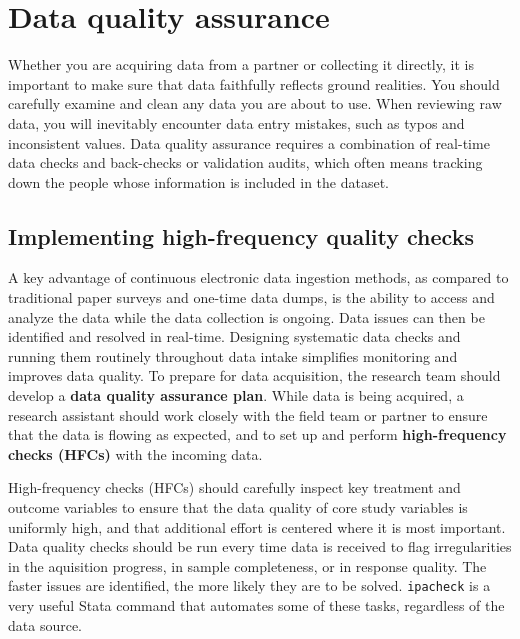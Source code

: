\section{Data quality assurance}

Whether you are acquiring data from a partner or collecting it directly,
it is important to make sure that data faithfully reflects ground realities.
You should carefully examine and clean any data you are about to use.
When reviewing raw data, you will inevitably encounter data entry mistakes,
such as typos and inconsistent values.
Data quality assurance requires a combination of real-time data checks
and back-checks or validation audits, which often means tracking down
the people whose information is included in the dataset.

\subsection{Implementing high-frequency quality checks}

A key advantage of continuous electronic data ingestion methods,
as compared to traditional paper surveys and one-time data dumps,
is the ability to access and analyze the data while the data collection is ongoing.
Data issues can then be identified and resolved in real-time.
Designing systematic data checks and running them routinely throughout data intake
simplifies monitoring and improves data quality.
To prepare for data acquisition,
the research team should develop a \textbf{data quality assurance plan}.
While data is being acquired,
a research assistant should work closely with the field team or partner
to ensure that the data is flowing as expected,
and to set up and perform \textbf{high-frequency checks (HFCs)} with the incoming data.

High-frequency checks (HFCs) should carefully inspect key treatment and outcome variables
to ensure that the data quality of core study variables is uniformly high,
and that additional effort is centered where it is most important.
Data quality checks should be run every time data is received 
to flag irregularities in the aquisition progress, in sample completeness, or in response quality.
The faster issues are identified, the more likely they are to be solved.
\texttt{ipacheck}
is a very useful Stata command that automates some of these tasks,
regardless of the data source.

